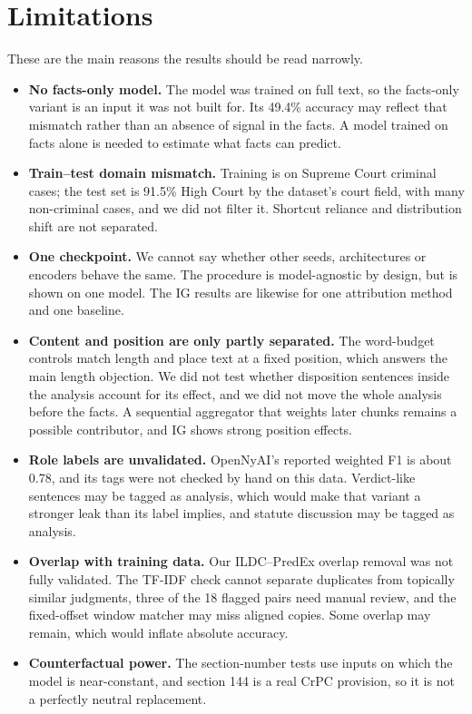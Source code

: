 \documentclass[conference]{IEEEtran}
\begin{document}
\section{Limitations}
\label{sec:limits}
These are the main reasons the results should be read narrowly.
\begin{itemize}[leftmargin=*]
    \item \textbf{No facts-only model.} The model was trained on full text, so the facts-only variant is an input it was not built for. Its 49.4\% accuracy may reflect that mismatch rather than an absence of signal in the facts. A model trained on facts alone is needed to estimate what facts can predict.
    \item \textbf{Train--test domain mismatch.} Training is on Supreme Court criminal cases; the test set is 91.5\% High Court by the dataset's court field, with many non-criminal cases, and we did not filter it. Shortcut reliance and distribution shift are not separated.
    \item \textbf{One checkpoint.} We cannot say whether other seeds, architectures or encoders behave the same. The procedure is model-agnostic by design, but is shown on one model. The IG results are likewise for one attribution method and one baseline.
    \item \textbf{Content and position are only partly separated.} The word-budget controls match length and place text at a fixed position, which answers the main length objection. We did not test whether disposition sentences inside the analysis account for its effect, and we did not move the whole analysis before the facts. A sequential aggregator that weights later chunks remains a possible contributor, and IG shows strong position effects.
    \item \textbf{Role labels are unvalidated.} OpenNyAI's reported weighted F1 is about 0.78, and its tags were not checked by hand on this data. Verdict-like sentences may be tagged as analysis, which would make that variant a stronger leak than its label implies, and statute discussion may be tagged as analysis.
    \item \textbf{Overlap with training data.} Our ILDC--PredEx overlap removal was not fully validated. The TF-IDF check cannot separate duplicates from topically similar judgments, three of the 18 flagged pairs need manual review, and the fixed-offset window matcher may miss aligned copies. Some overlap may remain, which would inflate absolute accuracy.
    \item \textbf{Counterfactual power.} The section-number tests use inputs on which the model is near-constant, and section 144 is a real CrPC provision, so it is not a perfectly neutral replacement.

\end{itemize}
\end{document}
